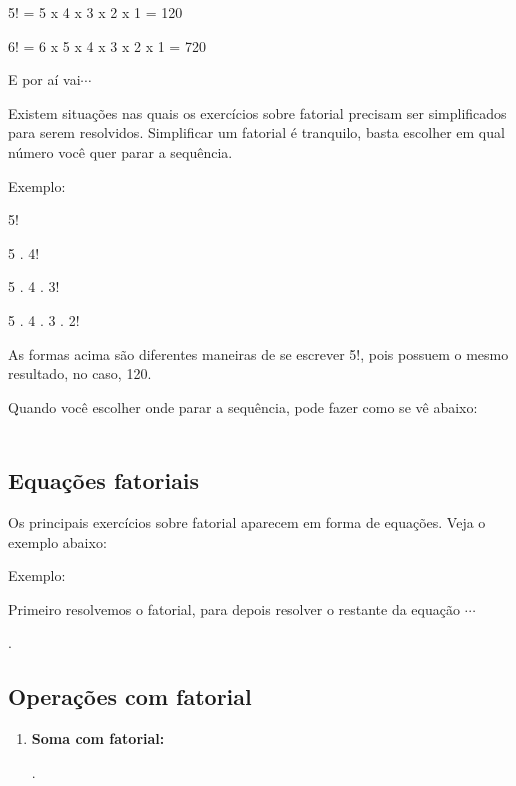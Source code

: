 \begin{multicols*}{2}
	5! = 5 x 4 x 3 x 2 x 1 = 120

	6! = 6 x 5 x 4 x 3 x 2 x 1 = 720

	E por aí vai$\cdots$

	Existem situações nas quais os exercícios sobre fatorial precisam ser simplificados para serem resolvidos. Simplificar um fatorial é tranquilo, basta escolher em qual número você quer parar a sequência.

	Exemplo:

	5!

	5 . 4!

	5 . 4 . 3!

	5 . 4 . 3 . 2!

	As formas acima são diferentes maneiras de se escrever 5!, pois possuem o mesmo resultado, no caso, 120.

	Quando você escolher onde parar a sequência, pode fazer como se vê abaixo:\\

	 \\


	\subsection{Equações fatoriais}

	Os principais exercícios sobre fatorial aparecem em forma de equações. Veja o exemplo abaixo:

	Exemplo: 

	Primeiro resolvemos o fatorial, para depois resolver o restante da equação $\cdots $



	.

	\subsection{Operações com fatorial}

	\begin{enumerate}

		\item \textbf{Soma com fatorial:}

		      .


\end{enumerate}
\end{multicols*}
